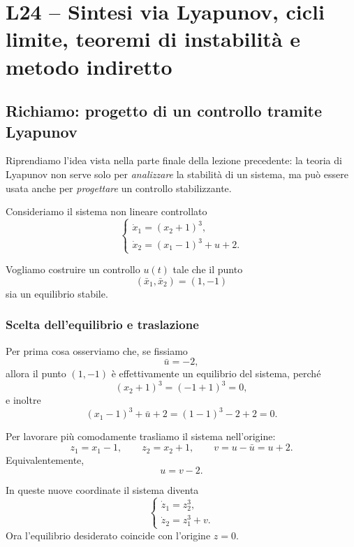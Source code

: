 
\chapter{L24 -- Sintesi via Lyapunov, cicli limite, teoremi di instabilit\`a e metodo indiretto}
\label{chap:L24}

\section{Richiamo: progetto di un controllo tramite Lyapunov}

Riprendiamo l'idea vista nella parte finale della lezione precedente: la teoria di Lyapunov non serve solo per \emph{analizzare} la stabilit\`a di un sistema, ma pu\`o essere usata anche per \emph{progettare} un controllo stabilizzante.

Consideriamo il sistema non lineare controllato
\begin{equation}
\label{eq:L24-sistema-controllato}
\begin{cases}
\dot x_1 = (x_2+1)^3,\\[4pt]
\dot x_2 = (x_1-1)^3 + u + 2.
\end{cases}
\end{equation}

Vogliamo costruire un controllo \(u(t)\) tale che il punto
\[
(\bar x_1,\bar x_2)=(1,-1)
\]
sia un equilibrio stabile.

\subsection{Scelta dell'equilibrio e traslazione}

Per prima cosa osserviamo che, se fissiamo
\[
\bar u=-2,
\]
allora il punto \((1,-1)\) \`e effettivamente un equilibrio del sistema, perch\'e
\[
(x_2+1)^3 = (-1+1)^3 = 0,
\]
e inoltre
\[
(x_1-1)^3 + \bar u + 2 = (1-1)^3 -2 + 2 = 0.
\]

Per lavorare pi\`u comodamente trasliamo il sistema nell'origine:
\[
z_1 = x_1-1,
\qquad
z_2 = x_2+1,
\qquad
v = u-\bar u = u+2.
\]
Equivalentemente,
\[
u = v-2.
\]

In queste nuove coordinate il sistema diventa
\begin{equation}
\label{eq:L24-sistema-traslato}
\begin{cases}
\dot z_1 = z_2^3,\\[4pt]
\dot z_2 = z_1^3 + v.
\end{cases}
\end{equation}
Ora l'equilibrio desiderato coincide con l'origine \(z=0\).


